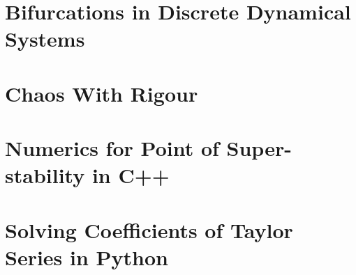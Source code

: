 \documentclass[12pt,oneside]{report}
\begin{document}
\maketitle

\declaration
\dedication{Musa mihi causas memora ...\\
	Muse, tell me the cause...
}

\tableofcontents

\chapter{Bifurcations in Discrete Dynamical Systems}


\chapter{Chaos With Rigour}


\begin{appendices}
	\chapter{Numerics for Point of Super-stability in C++}
	
	\chapter{Solving Coefficients of Taylor Series in Python}
	
\end{appendices}
%  
\printbibliography
{}
\end{document}
